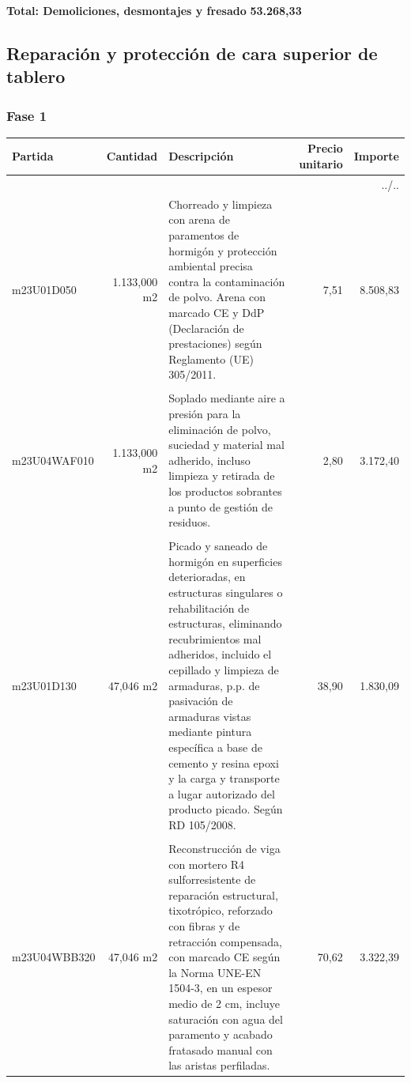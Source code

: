 \documentclass{book}%
\begin{document}
%
\noindent%
\large%
\textbf{Total: Demoliciones, desmontajes y fresado }%
\dotfill%
\textbf{53.268,33}%
\newline%
\normalsize

%
\subsection{Reparación y protección de cara superior de tablero}%
\subsubsection{Fase 1}%
\small%
\begin{longtable}{lrlrr}%
Partida&Cantidad&Descripción&\multicolumn{1}{p{1.5cm}}{Precio unitario}&Importe\\%
\hline%
\endhead%
\multicolumn{5}{r}{../..}\\%
\endfoot%
\hline%
\endlastfoot%
m23U01D050& 1.133,000 m2&\multicolumn{1}{p{5cm}}{Chorreado y limpieza con arena de paramentos de hormigón y protección ambiental precisa contra la contaminación de polvo. Arena con marcado CE y DdP (Declaración de prestaciones) según Reglamento (UE) 305/2011.}&      7,51&8.508,83\\%
&&&&\\%
m23U04WAF010& 1.133,000 m2&\multicolumn{1}{p{5cm}}{Soplado mediante aire a presión para la eliminación de polvo, suciedad y material mal adherido, incluso limpieza y retirada de los productos sobrantes a punto de gestión de residuos.}&      2,80&3.172,40\\%
&&&&\\%
m23U01D130&    47,046 m2&\multicolumn{1}{p{5cm}}{Picado y saneado de hormigón en superficies deterioradas, en estructuras singulares o rehabilitación de estructuras, eliminando recubrimientos mal adheridos, incluido el cepillado y limpieza de armaduras, p.p. de pasivación de armaduras vistas mediante pintura específica a base de cemento y resina epoxi y la carga y transporte a lugar autorizado del producto picado. Según RD 105/2008.}&     38,90&1.830,09\\%
&&&&\\%
m23U04WBB320&    47,046 m2&\multicolumn{1}{p{5cm}}{Reconstrucción de viga con mortero R4 sulforresistente de reparación estructural, tixotrópico, reforzado con fibras y de retracción compensada, con marcado CE según la Norma UNE{-}EN 1504{-}3, en un espesor medio de 2 cm, incluye saturación con agua del paramento y acabado fratasado manual con las aristas perfiladas.}&     70,62&3.322,39\\%

\end{longtable}
\end{document}
